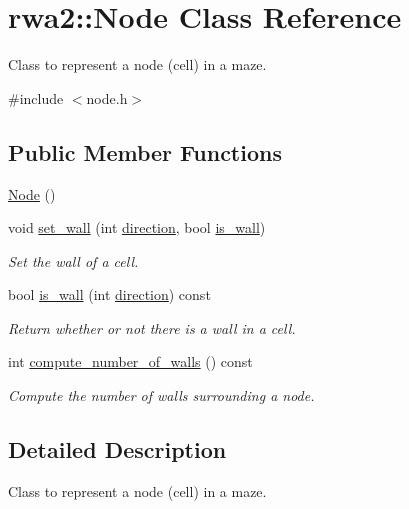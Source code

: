 \hypertarget{classrwa2_1_1_node}{}\section{rwa2\+:\+:Node Class Reference}
\label{classrwa2_1_1_node}


Class to represent a node (cell) in a maze.  




{\ttfamily \#include $<$node.\+h$>$}

\subsection*{Public Member Functions}
\begin{DoxyCompactItemize}
\item 
\hyperlink{classrwa2_1_1_node_abc9f6033393b7beee29ea7882a897582}{Node} ()
\item 
void \hyperlink{classrwa2_1_1_node_a9e887221d02616392f572dd4018b71ed}{set\+\_\+wall} (int \hyperlink{util_8h_a99f26e6ee9fcd62f75203b5402df8098}{direction}, bool \hyperlink{classrwa2_1_1_node_acd6ab64157b7b60bea708ddb52ddb1a8}{is\+\_\+wall})
\begin{DoxyCompactList}\small\item\em Set the wall of a cell. \end{DoxyCompactList}\item 
bool \hyperlink{classrwa2_1_1_node_acd6ab64157b7b60bea708ddb52ddb1a8}{is\+\_\+wall} (int \hyperlink{util_8h_a99f26e6ee9fcd62f75203b5402df8098}{direction}) const
\begin{DoxyCompactList}\small\item\em Return whether or not there is a wall in a cell. \end{DoxyCompactList}\item 
int \hyperlink{classrwa2_1_1_node_a6057b0b97f6b815a57aad534cd021674}{compute\+\_\+number\+\_\+of\+\_\+walls} () const
\begin{DoxyCompactList}\small\item\em Compute the number of walls surrounding a node. \end{DoxyCompactList}\end{DoxyCompactItemize}


\subsection{Detailed Description}
Class to represent a node (cell) in a maze. 

